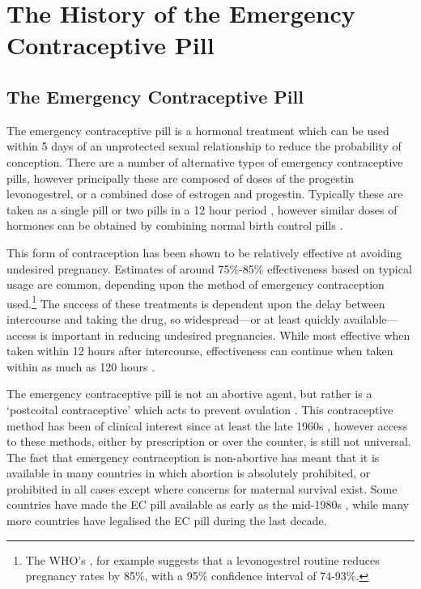 \section{The History of the Emergency Contraceptive Pill}
\label{TEENscn:background}
\vspace{-5mm}
\subsection{The Emergency Contraceptive Pill}
The emergency contraceptive pill is a hormonal treatment which can be used 
within 5 days of an unprotected sexual relationship to reduce the probability
of conception.  There are a number of alternative types of emergency 
contraceptive pills, however principally these are composed of doses of the 
progestin levonogestrel, or a combined dose of estrogen and progestin. 
Typically these are taken as a single pill or two pills in a 12 hour period
\citep{vonHertzenetal2002}, however similar doses of hormones can be obtained 
by combining normal birth control pills \citep{Ellersonetal1998}.  

This form of contraception has been shown to be relatively effective at 
avoiding undesired pregnancy.  Estimates of around 75\%-85\% effectiveness 
based on typical usage are common, depending upon the method of emergency 
contraception used.\footnote{The WHO's \citet{WHO1998}, for example suggests 
that a levonogestrel routine reduces pregnancy rates by 85\%, with a 95\% 
confidence interval of 74-93\%.}  The success of these treatments is dependent
upon the delay between intercourse and taking the drug, so widespread---or at 
least quickly available---access is important in reducing undesired pregnancies.
While most effective when taken within 12 hours after intercourse, 
effectiveness can continue when taken within as much as 120 hours
\citep{vonHertzenetal2002}.

The emergency contraceptive pill is not an abortive agent, but rather is a 
`postcoital contraceptive' which acts to prevent ovulation 
\citep{Novikovaetal2007, Noeetal2011}. This contraceptive method has been of 
clinical interest since at least the late 1960s \citep{Demers1971}, however 
access to these methods, either by prescription or over the counter, is still 
not universal.  The fact that emergency contraception is non-abortive has 
meant that it is available in many countries in which abortion is absolutely 
prohibited, or prohibited in all cases except where concerns for maternal 
survival exist.  Some countries have made the EC pill available as early as 
the mid-1980s \citep{UKFPA2006}, while many more countries have legalised 
the EC pill during the last decade.

